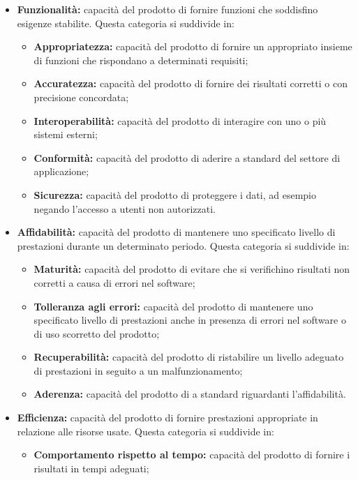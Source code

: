 \documentclass{scalatekids-article}
\begin{document}
\begin{itemize}
  \item{\textbf{Funzionalità:} capacità del prodotto di fornire funzioni che soddisfino esigenze stabilite. Questa categoria si suddivide in:}
    \begin{itemize}
      \item{\textbf{Appropriatezza:} capacità del prodotto di fornire un appropriato insieme di funzioni che rispondano a determinati requisiti;}
      \item{\textbf{Accuratezza:} capacità del prodotto di fornire dei risultati corretti o con precisione concordata;}
      \item{\textbf{Interoperabilità:} capacità del prodotto di interagire con uno o più sistemi esterni;}
      \item{\textbf{Conformità:} capacità del prodotto di aderire a standard del settore di applicazione;}
      \item{\textbf{Sicurezza:} capacità del prodotto di proteggere i dati, ad esempio negando l'accesso a utenti non autorizzati.}
    \end{itemize}
  \item{\textbf{Affidabilità:} capacità del prodotto di mantenere uno specificato livello di prestazioni durante un determinato periodo. Questa categoria si suddivide in:}
    \begin{itemize}
      \item{\textbf{Maturità:} capacità del prodotto di evitare che si verifichino risultati non corretti a causa di errori nel software;}
      \item{\textbf{Tolleranza agli errori:} capacità del prodotto di mantenere uno specificato livello di prestazioni anche in presenza di errori nel software o di uso scorretto del prodotto;}
      \item{\textbf{Recuperabilità:} capacità del prodotto di ristabilire un livello adeguato di prestazioni in seguito a un malfunzionamento;}
      \item{\textbf{Aderenza:} capacità del prodotto di a standard riguardanti l'affidabilità.}
    \end{itemize}
  \item{\textbf{Efficienza:} capacità del prodotto di fornire prestazioni appropriate in relazione alle risorse usate. Questa categoria si suddivide in:}
    \begin{itemize}
      \item{\textbf{Comportamento rispetto al tempo:} capacità del prodotto di fornire i risultati in tempi adeguati;}

\end{itemize}
\end{itemize}
\end{document}
